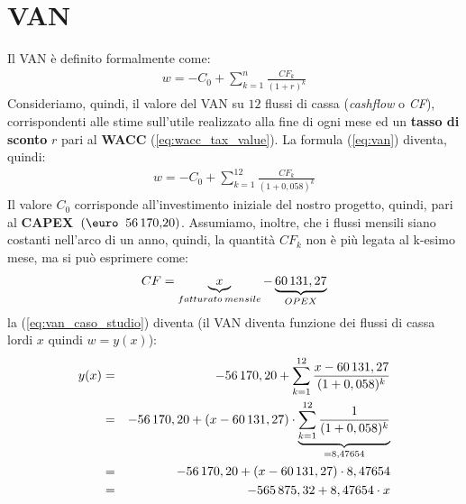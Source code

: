\section[VAN]{VAN}
	Il \ac{VAN} è definito formalmente come: 
	\begin{equation}
	\label{eq:van}
	\begin{split}
 		w = - C_0 + \sum_{k=1}^n \frac{CF_k}{(1+r)^k}
	\end{split}
	\end{equation}
	Consideriamo, quindi, il valore del \ac{VAN} su $12$ flussi di cassa (\textit{cashflow} o \textit{CF}), corrispondenti alle stime sull'utile realizzato alla fine di ogni mese ed un \textbf{tasso di sconto} $r$ pari al \textbf{\ac{WACC}} (\ref{eq:wacc_tax_value}).\newline
	La formula (\ref{eq:van}) diventa, quindi:	
	\begin{equation}
	\label{eq:van_caso_studio}
	\begin{split}
 		w = - C_0 + \sum_{k=1}^{12} \frac{CF_k}{(1+0,058)^k}
	\end{split}
	\end{equation}	
	Il valore $C_0$ corrisponde all'investimento iniziale del nostro progetto, quindi, pari al \textbf{CAPEX} $\:(\mbox{\euro\: 56\thinspace 170,20})$.
	Assumiamo, inoltre, che i flussi mensili siano costanti nell'arco di un anno, quindi, la quantità $CF_k$ non è più legata al k-esimo mese, ma si può esprimere come:
	\begin{equation}
	\label{eq:flussi_cassa_mensili}
	\begin{split}
 		CF = \underbrace{x}_{fatturato \: mensile} - \underbrace{60\thinspace 131,27}_{OPEX}
	\end{split}
	\end{equation}	  	
la (\ref{eq:van_caso_studio}) diventa (il VAN diventa funzione dei flussi di cassa lordi $x$ quindi $w = y(x)$):	
	\begin{eqnarray}
	\label{eq:van_caso_studio_2}
 		y(x) & = & - 56\thinspace 170,20 + \sum_{k=1}^{12} \frac{x - 60\thinspace 131,27}{(1+0,058)^k} \nonumber \\
 		 & = & -56\thinspace 170,20 + (x - 60\thinspace 131,27) \cdot \underbrace{\sum_{k=1}^{12} \frac{1} {(1+0,058)^{k}}}_{{}=8,47654} \nonumber \\
 		 & = & -56\thinspace 170,20 + (x - 60\thinspace 131,27) \cdot 8,47654 \nonumber \\
 		 & = & -565\thinspace 875,32 + 8,47654 \cdot x 		
	\end{eqnarray}  		

